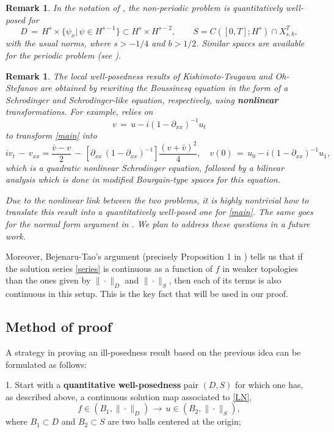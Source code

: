 \documentclass{amsart}
\newtheorem{remark}[theorem]{Remark}
\begin{document}
\begin{remark}
In the notation of \cite{F09}, the non-periodic problem is quantitatively well-posed for
\[
D\,=\,H^s\times \{\psi_x |\,\psi\in H^{s-1}\} \subset H^s\times H^{s-2}, \qquad S= C([0,T]; H^s)\cap X^T_{s,b},\]
with the usual norms, where $s>-1/4$ and $b>1/2$. Similar spaces are available for the periodic problem (see \cite{FS10}).
\label{qw}
\end{remark}


\begin{remark}
The local well-posedness results of Kishimoto-Tsugawa \cite{KT10} and Oh-Stefanov \cite{OS12} are obtained by rewriting the Boussinesq equation in the form of a Schrodinger and Schrodinger-like equation, respectively, using \textbf{nonlinear} transformations. For example, \cite{KT10} relies on
\[
v\,=\,u - i(1 - \partial_{xx})^{-1} u_t\]
to transform \eqref{main} into
\[
 i v_{t} \,-\, v_{xx} = \frac{\bar{v}-v}{2}\, -
\,\left[\partial_{xx}\,(1 - \partial_{xx})^{-1}\right] \frac{(v + \bar{v})^{2}}{4}, \quad v(0)\,=\,u_0 - i(1 - \partial_{xx})^{-1} u_1,
\]
which is a quadratic nonlinear Schrodinger equation, followed by a bilinear analysis which is done in modified Bourgain-type spaces for this equation. 

Due to the nonlinear link between the two problems, it is highly nontrivial how to translate this result into a quantitatively well-posed one for \eqref{main}. The same goes for the normal form argument in  \cite{OS12}. We plan to address these questions in a future work.
\label{sw}
\end{remark}

Moreover, Bejenaru-Tao's argument (precisely Proposition 1 in \cite{BT06}) tells us that if the solution series \eqref{series} is continuous as a function of $f$ in  weaker topologies than the ones given by $\| \cdot\|_D$ and $\| \cdot \|_S$, then each of its terms is also continuous in this setup. This is the key fact  that will be used in our proof.

\subsection{Method of proof} A strategy in proving an ill-posedness result based on the previous idea can be formulated as follows:

1. Start with a \textbf{quantitative well-posedness} pair $(D,S)$ for which one has, as described above, a continuous solution map associated to \eqref{LN},
\begin{equation}
f\in (B_1,\|\cdot \|_D)\,\longrightarrow\,u\in (B_2,\|\cdot \|_S),
\end{equation} 
where $B_1\subset D$ and $B_2 \subset S$ are two balls centered at the origin;
\end{document}
